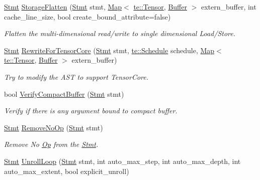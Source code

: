 \begin{DoxyCompactItemize}
\hyperlink{classtvm_1_1tir_1_1Stmt}{Stmt} \hyperlink{namespacetvm_1_1tir_a2c63e0decac1e98ee375d32dee15526e}{Storage\+Flatten} (\hyperlink{classtvm_1_1tir_1_1Stmt}{Stmt} stmt, \hyperlink{classtvm_1_1Map}{Map}$<$ \hyperlink{classtvm_1_1te_1_1Tensor}{te\+::\+Tensor}, \hyperlink{classtvm_1_1tir_1_1Buffer}{Buffer} $>$ extern\+\_\+buffer, int cache\+\_\+line\+\_\+size, bool create\+\_\+bound\+\_\+attribute=false)
\begin{DoxyCompactList}\small\item\em Flatten the multi-\/dimensional read/write to single dimensional Load/\+Store. \end{DoxyCompactList}\item 
\hyperlink{classtvm_1_1tir_1_1Stmt}{Stmt} \hyperlink{namespacetvm_1_1tir_a00e711fe4801fd2d11f85cb64bc64d56}{Rewrite\+For\+Tensor\+Core} (\hyperlink{classtvm_1_1tir_1_1Stmt}{Stmt} stmt, \hyperlink{classtvm_1_1te_1_1Schedule}{te\+::\+Schedule} schedule, \hyperlink{classtvm_1_1Map}{Map}$<$ \hyperlink{classtvm_1_1te_1_1Tensor}{te\+::\+Tensor}, \hyperlink{classtvm_1_1tir_1_1Buffer}{Buffer} $>$ extern\+\_\+buffer)
\begin{DoxyCompactList}\small\item\em Try to modify the A\+ST to support Tensor\+Core. \end{DoxyCompactList}\item 
bool \hyperlink{namespacetvm_1_1tir_ae892521d99d9475a59e2d01df9413b49}{Verify\+Compact\+Buffer} (\hyperlink{classtvm_1_1tir_1_1Stmt}{Stmt} stmt)
\begin{DoxyCompactList}\small\item\em Verify if there is any argument bound to compact buffer. \end{DoxyCompactList}\item 
\hyperlink{classtvm_1_1tir_1_1Stmt}{Stmt} \hyperlink{namespacetvm_1_1tir_a64dd52c904c2944a4771b81a2cf8f08a}{Remove\+No\+Op} (\hyperlink{classtvm_1_1tir_1_1Stmt}{Stmt} stmt)
\begin{DoxyCompactList}\small\item\em Remove No \hyperlink{classtvm_1_1Op}{Op} from the \hyperlink{classtvm_1_1tir_1_1Stmt}{Stmt}. \end{DoxyCompactList}\item 
\hyperlink{classtvm_1_1tir_1_1Stmt}{Stmt} \hyperlink{namespacetvm_1_1tir_a319c8f6b65c8c053c87b429d6d791343}{Unroll\+Loop} (\hyperlink{classtvm_1_1tir_1_1Stmt}{Stmt} stmt, int auto\+\_\+max\+\_\+step, int auto\+\_\+max\+\_\+depth, int auto\+\_\+max\+\_\+extent, bool explicit\+\_\+unroll)

\end{DoxyCompactItemize}
